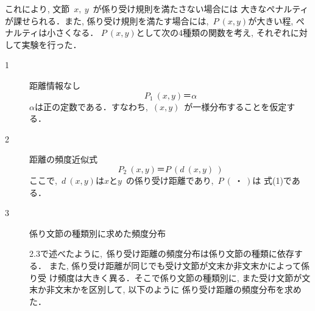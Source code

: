 これにより, 文節\ $x,\ y$\ が係り受け規則を満たさない場合には
大きなぺナルティが課せられる．また, 係り受け規則を満たす場合には,\ 
$P\ (x ,y)$が大きい程, ぺナルティは小さくなる．
$P\ (x ,y)$として次の4種類の関数を考え, それぞれに対して実験を行った．
\begin{description}
\item[1] 距離情報なし
    \[P_1\ (x ,y)＝α\] 
$α$は正の定数である．すなわち,\ $(x ,y)$\ が一様分布することを仮定する．
\item[2] 距離の頻度近似式
\[P_2\ (x ,y)＝P\ (d\ (x,y)\ )\] 
ここで,\ $d\ (x,y)$は$x$と$y$\ の係り受け距離であり,\ $P\ (\ ・\ )$は
式(1)である．

\item[3] 係り文節の種類別に求めた頻度分布 

2.3で述べたように,\ 係り受け距離の頻度分布は係り文節の種類に依存する．
また, 係り受け距離が同じでも受け文節が文末か非文末かによって係り受
け頻度は大きく異る\cite{maruyama}．そこで係り文節の種類別に,
 また受け文節が文末か非文末かを区別して, 以下のように
係り受け距離の頻度分布を求めた．


\end{description}
